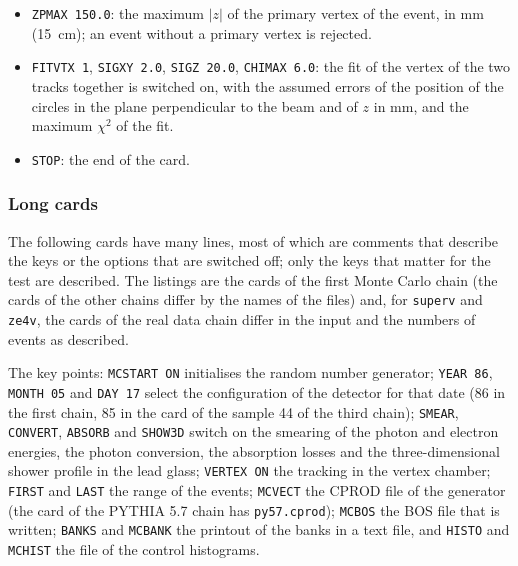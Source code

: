 \begin{itemize}
\item \texttt{ZPMAX 150.0}: the maximum $|z|$ of the primary vertex of the event, in mm (15~cm); an event without a primary vertex is rejected.
\item \texttt{FITVTX 1}, \texttt{SIGXY 2.0}, \texttt{SIGZ 20.0}, \texttt{CHIMAX 6.0}: the fit of the vertex of the two tracks together is switched on, with the assumed errors of the position of the circles in the plane perpendicular to the beam and of $z$ in mm, and the maximum $\chi^2$ of the fit.
\item \texttt{STOP}: the end of the card.
\end{itemize}

\subsubsection{Long cards}
The following cards have many lines, most of which are comments that describe the keys or the options that are switched off; only the keys that matter for the test are described. The listings are the
cards of the first Monte Carlo chain (the cards of the other chains differ by the names of the files) and, for \texttt{superv} and \texttt{ze4v}, the cards of the real data chain differ in the input and the numbers of events as described.


The key points: \texttt{MCSTART ON} initialises the random number generator; \texttt{YEAR 86}, \texttt{MONTH 05} and \texttt{DAY 17} select the configuration of the detector for that date (86 in the first chain, 85 in the card of the sample 44 of the third chain);
\texttt{SMEAR}, \texttt{CONVERT}, \texttt{ABSORB} and \texttt{SHOW3D} switch on the smearing of the photon and electron energies, the photon conversion, the absorption losses and the three-dimensional shower profile in the lead glass;
\texttt{VERTEX ON} the tracking in the vertex chamber; \texttt{FIRST} and \texttt{LAST} the range of the events; \texttt{MCVECT} the CPROD file of the generator (the card of the PYTHIA 5.7 chain has \texttt{py57.cprod}); \texttt{MCBOS} the BOS file that is written;
\texttt{BANKS} and \texttt{MCBANK} the printout of the banks in a text file, and \texttt{HISTO} and \texttt{MCHIST} the file of the control histograms.


